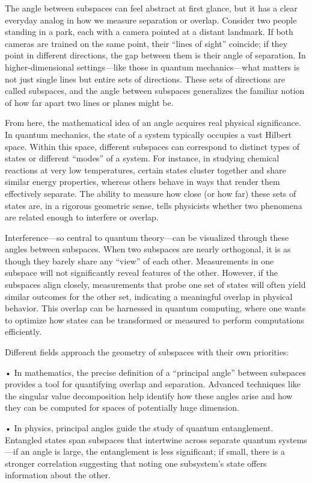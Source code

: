 The angle between subspaces can feel abstract at first glance, but it has a clear everyday analog in how we measure separation or overlap. Consider two people standing in a park, each with a camera pointed at a distant landmark. If both cameras are trained on the same point, their “lines of sight” coincide; if they point in different directions, the gap between them is their angle of separation. In higher-dimensional settings—like those in quantum mechanics—what matters is not just single lines but entire sets of directions. These sets of directions are called subspaces, and the angle between subspaces generalizes the familiar notion of how far apart two lines or planes might be.

From here, the mathematical idea of an angle acquires real physical significance. In quantum mechanics, the state of a system typically occupies a vast Hilbert space. Within this space, different subspaces can correspond to distinct types of states or different “modes” of a system. For instance, in studying chemical reactions at very low temperatures, certain states cluster together and share similar energy properties, whereas others behave in ways that render them effectively separate. The ability to measure how close (or how far) these sets of states are, in a rigorous geometric sense, tells physicists whether two phenomena are related enough to interfere or overlap.

Interference—so central to quantum theory—can be visualized through these angles between subspaces. When two subspaces are nearly orthogonal, it is as though they barely share any “view” of each other. Measurements in one subspace will not significantly reveal features of the other. However, if the subspaces align closely, measurements that probe one set of states will often yield similar outcomes for the other set, indicating a meaningful overlap in physical behavior. This overlap can be harnessed in quantum computing, where one wants to optimize how states can be transformed or measured to perform computations efficiently.

Different fields approach the geometry of subspaces with their own priorities:

• In mathematics, the precise definition of a “principal angle” between subspaces provides a tool for quantifying overlap and separation. Advanced techniques like the singular value decomposition help identify how these angles arise and how they can be computed for spaces of potentially huge dimension.

• In physics, principal angles guide the study of quantum entanglement. Entangled states span subspaces that intertwine across separate quantum systems—if an angle is large, the entanglement is less significant; if small, there is a stronger correlation suggesting that noting one subsystem’s state offers information about the other.

